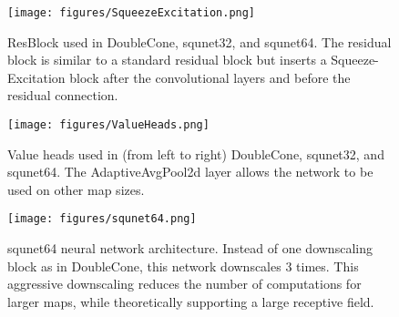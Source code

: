 \documentclass{article}
\begin{document}
\begin{figure}[h]
    \begin{center}
        \texttt{[image: figures/SqueezeExcitation.png]}
    \end{center}
    \caption{ResBlock used in DoubleCone, squnet32, and squnet64. The residual block is similar to a standard residual block but inserts a Squeeze-Excitation block after the convolutional layers and before the residual connection.}
    \label{fig:squeezeexcitation}
\end{figure}

\begin{figure}[h]
    \begin{center}
        \texttt{[image: figures/ValueHeads.png]}
    \end{center}
    \caption{Value heads used in (from left to right) DoubleCone, squnet32, and
    squnet64. The AdaptiveAvgPool2d layer allows the network to be used on other map
    sizes.}
    \label{fig:valueheads}
\end{figure}

\begin{figure}[H]
    \begin{center}
        \texttt{[image: figures/squnet64.png]}
    \end{center}
    \caption{squnet64 neural network architecture. Instead of one downscaling block as in DoubleCone, this network downscales 3 times. This aggressive downscaling reduces the number of computations for larger maps, while theoretically supporting a large receptive field.}
    \label{fig:squnet}
\end{figure}
        
\end{document}
